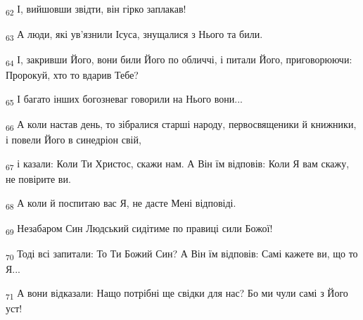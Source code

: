 \begin{tcolorbox}
\textsubscript{62} І, вийшовши звідти, він гірко заплакав!
\end{tcolorbox}
\begin{tcolorbox}
\textsubscript{63} А люди, які ув'язнили Ісуса, знущалися з Нього та били.
\end{tcolorbox}
\begin{tcolorbox}
\textsubscript{64} І, закривши Його, вони били Його по обличчі, і питали Його, приговорюючи: Пророкуй, хто то вдарив Тебе?
\end{tcolorbox}
\begin{tcolorbox}
\textsubscript{65} І багато інших богозневаг говорили на Нього вони...
\end{tcolorbox}
\begin{tcolorbox}
\textsubscript{66} А коли настав день, то зібралися старші народу, первосвященики й книжники, і повели Його в синедріон свій,
\end{tcolorbox}
\begin{tcolorbox}
\textsubscript{67} і казали: Коли Ти Христос, скажи нам. А Він їм відповів: Коли Я вам скажу, не повірите ви.
\end{tcolorbox}
\begin{tcolorbox}
\textsubscript{68} А коли й поспитаю вас Я, не дасте Мені відповіді.
\end{tcolorbox}
\begin{tcolorbox}
\textsubscript{69} Незабаром Син Людський сидітиме по правиці сили Божої!
\end{tcolorbox}
\begin{tcolorbox}
\textsubscript{70} Тоді всі запитали: То Ти Божий Син? А Він їм відповів: Самі кажете ви, що то Я...
\end{tcolorbox}
\begin{tcolorbox}
\textsubscript{71} А вони відказали: Нащо потрібні ще свідки для нас? Бо ми чули самі з Його уст!
\end{tcolorbox}
